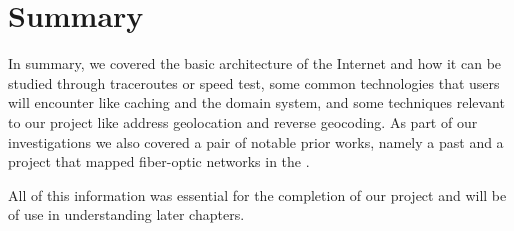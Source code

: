 \section{Summary}

In summary, we covered the basic architecture of the Internet and how it can be studied through traceroutes or speed test, some common technologies that users will encounter like caching and the domain system, and some techniques relevant to our project like \ip address geolocation and reverse geocoding. As part of our investigations we also covered a pair of notable prior works, namely a past \wpi \mqp and a project that mapped fiber-optic networks in the \us.

All of this information was essential for the completion of our project and will be of use in understanding later chapters.
